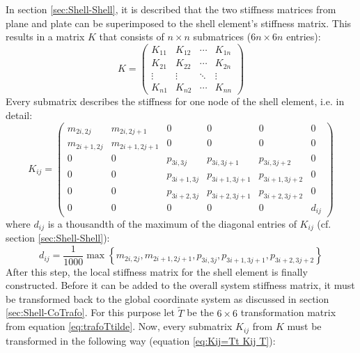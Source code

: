    In section \ref{sec:Shell-Shell}, it is described that the two stiffness matrices from plane and plate can be superimposed to the shell element's stiffness matrix. This results in a matrix $K$ that consists of $n\!\times\! n$ submatrices ($6n\!\times\! 6n$ entries):
   \begin{equation*}
   K = \begin{pmatrix}
   K_{11} & K_{12} & \cdots & K_{1n}\\
   K_{21} & K_{22} & \cdots & K_{2n}\\
   \vdots & \vdots & \ddots & \vdots\\
   K_{n1} & K_{n2} & \cdots & K_{nn}
   \end{pmatrix}
   \end{equation*}
   Every submatrix describes the stiffness for one node of the shell element, i.e. in detail:
   \begin{equation*}
   K_{ij} = \begin{pmatrix}
   m_{2i,2j}   & m_{2i,2j+1}   & 0           & 0             & 0             & 0\\
   m_{2i+1,2j} & m_{2i+1,2j+1} & 0           & 0             & 0             & 0\\
   0           & 0             & p_{3i,3j}   & p_{3i,3j+1}   & p_{3i,3j+2}   & 0\\
   0           & 0             & p_{3i+1,3j} & p_{3i+1,3j+1} & p_{3i+1,3j+2} & 0\\
   0           & 0             & p_{3i+2,3j} & p_{3i+2,3j+1} & p_{3i+2,3j+2} & 0\\
   0           & 0             & 0           & 0             & 0             & d_{ij}
   \end{pmatrix}
   \end{equation*}
   where $d_{ij}$ is a thousandth of the maximum of the diagonal entries of $K_{ij}$ (cf. section \ref{sec:Shell-Shell}):
   \begin{equation*}
   d_{ij} = \frac{1}{1000}\max \left\lbrace m_{2i,2j}, m_{2i+1,2j+1}, p_{3i,3j}, p_{3i+1,3j+1}, p_{3i+2,3j+2} \right\rbrace 
   \end{equation*}
   After this step, the local stiffness matrix for the shell element is finally constructed. Before it can be added to the overall system stiffness matrix, it must be transformed back to the global coordinate system as discussed in section \ref{sec:Shell-CoTrafo}.
   For this purpose let $\tilde{T}$ be the $6\!\times\! 6$ transformation matrix from equation \ref{eq:trafoTtilde}. Now, every submatrix $K_{ij}$ from $K$ must be transformed in the following way (equation \ref{eq:Kij=Tt Kij T}):
